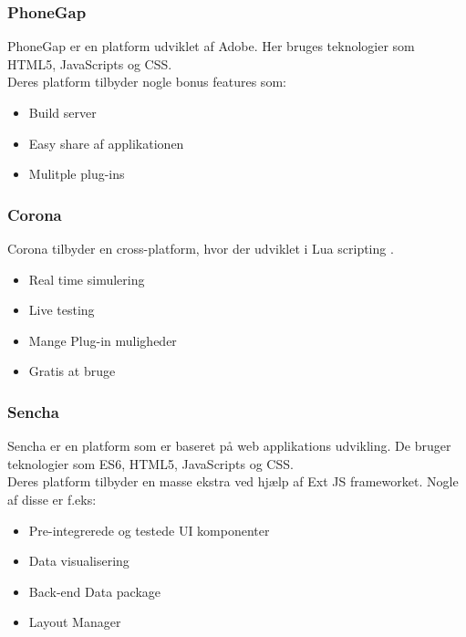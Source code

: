 \subsubsection{PhoneGap}
PhoneGap er en platform udviklet af Adobe\cite{Adobe}. Her bruges teknologier som HTML5\cite{HTML5}, JavaScripts\cite{JavaScript} og CSS\cite{CSS}. \\
Deres platform tilbyder nogle bonus features som:
\begin{itemize}[-]
	\item Build server
	\item Easy share af applikationen 
	\item Mulitple plug-ins
\end{itemize}

\subsubsection{Corona}
Corona tilbyder en cross-platform, hvor der udviklet i Lua scripting \cite{Lua}.
\begin{itemize}[-]
	\item Real time simulering
	\item Live testing
	\item Mange Plug-in muligheder
	\item Gratis at bruge
\end{itemize}

\subsubsection{Sencha}
Sencha er en platform som er baseret på web applikations udvikling. De bruger teknologier som ES6\cite{ES6}, HTML5\cite{HTML5}, JavaScripts\cite{JavaScript} og CSS\cite{CSS}. \\
Deres platform tilbyder en masse ekstra ved hjælp af Ext JS frameworket. Nogle af disse er f.eks:
\begin{itemize}[-]
	\item Pre-integrerede og testede UI komponenter
	\item Data visualisering
	\item Back-end Data package
	\item Layout Manager
\end{itemize}


